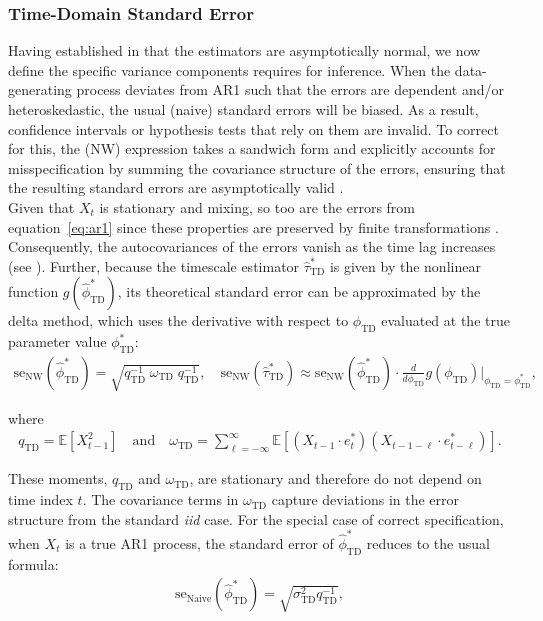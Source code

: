 \documentclass[9pt]{article}
\newcommand{\phitd}{\phi_{\scriptscriptstyle\text{TD}}}
\newcommand{\hatphitd}{\hat{\phi}^*_{\scriptscriptstyle\text{TD}}}
\newcommand{\hattautd}{\hat{\tau}^*_{\scriptscriptstyle\text{TD}}}
\newcommand{\qtd}{q_{\scriptscriptstyle\text{TD}}}
\newcommand{\omegatd}{\omega_{\scriptscriptstyle\text{TD}}}
\newcommand{\sigmatd}{\sigma_{\scriptscriptstyle\text{TD}}}
\begin{document}
\subsubsection{Time-Domain Standard Error}\label{sec:stderr-time-domain}
Having established in  that the estimators are asymptotically normal, we now define the specific variance components requires for inference. When the data-generating process deviates from AR1 such that the errors are dependent and/or heteroskedastic, the usual (naive) standard errors will be biased. As a result, confidence intervals or hypothesis tests that rely on them are invalid. To correct for this, the \citet{newey_simple_1987} (NW) expression takes a sandwich form and explicitly accounts for misspecification by summing the covariance structure of the errors, ensuring that the resulting standard errors are asymptotically valid \citep[Theorem 14.32]{hansen_econometrics_2022}.\\

Given that $X_t$ is stationary and mixing, so too are the errors from equation~\eqref{eq:ar1} since these properties are preserved by finite transformations \citep[Theorem~14.2 and Theorem~14.12]{hansen_econometrics_2022}. Consequently, the autocovariances of the errors vanish as the time lag increases (see ). Further, because the timescale estimator $\hattautd$ is given by the nonlinear function $g(\hatphitd)$, its theoretical standard error can be approximated by the delta method, which uses the derivative with respect to $\phitd$ evaluated at the true parameter value $\phitd^*$:
\begin{align}
    \text{se}_{\text{NW}}(\hatphitd) = \sqrt{\qtd^{-1}\; \omegatd \; \qtd^{-1}} \label{eq:se-ar1-phi}, \quad
    \text{se}_{\text{NW}}(\hattautd) \approx \text{se}_{\text{NW}}(\hatphitd) \cdot \frac{d}{d\phitd} g(\phitd)\big|_{\phitd=\phitd^*},
\end{align}

\noindent where
\begin{align}\label{eq:se-ar1-qomega}
    \qtd = \mathbb{E}[X_{t-1}^2] \quad\text{and}\quad \omegatd = \sum_{\ell=-\infty}^{\infty} \mathbb{E}[(X_{t-1} \cdot e_t^*)(X_{t-1-\ell} \cdot e_{t-\ell}^*)].
\end{align}

\noindent These moments, $\qtd$ and $\omegatd$, are stationary and therefore do not depend on time index $t$. The covariance terms in $\omegatd$ capture deviations in the error structure from the standard \textit{iid} case. For the special case of correct specification, when $X_t$ is a true AR1 process, the standard error of $\hatphitd$ reduces to the usual formula:
\begin{align}
    \text{se}_{\text{Naive}}(\hatphitd) = \sqrt{\sigmatd^2 \qtd^{-1}},
\end{align}
\end{document}
